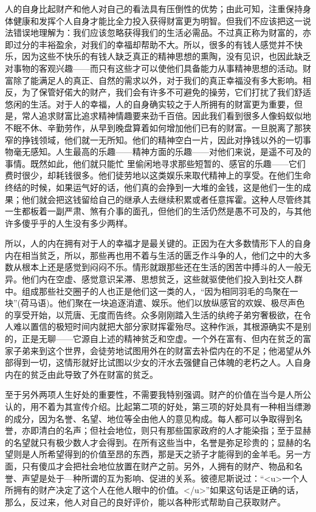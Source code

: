 \documentclass[12pt,oneside]{book}
\begin{document}
人的自身比起财产和他人对自己的看法具有压倒性的优势；由此可知，注重保持身体健康和发挥个人自身才能比全力投入获得财富更为明智。但我们不应该把这一说法错误地理解为：我们应该忽略获得我们的生活必需品。不过真正称为财富的，亦即过分的丰裕盈余，对我们的幸福却帮助不大。所以，很多的有钱人感觉并不快乐，因为这些不快乐的有钱人缺乏真正的精神思想的熏陶，没有见识，也因此缺乏对事物的客观兴趣——而只有这些才可以使他们具备能力从事精神思想的活动。财富除了能满足人的真正、自然的需求以外，对于我们的真正幸福没有多大影响。相反，为了保管好偌大的财产，我们会有许多不可避免的操劳，它们打扰了我们舒适悠闲的生活。对于人的幸福，人的自身确实较之于人所拥有的财富更为重要，但是，常人追求财富比追求精神情趣要来劲千百倍。因此我们看到很多人像蚂蚁似地不眠不休、辛勤劳作，从早到晚盘算着如何增加他们已有的财富。一旦脱离了那狭窄的挣钱领域，他们就一无所知。他们的精神空白一片，因此对挣钱以外的一切事物毫无感知。人生最高的乐趣——精神方面的乐趣——对他们来说，是遥不可及的事情。既然如此，他们就只能忙
里偷闲地寻求那些短暂的、感官的乐趣——它们费时很少，却耗钱很多。他们徒劳地以这类娱乐来取代精神上的享受。在他们生命终结的时候，如果运气好的话，他们真的会挣到一大堆的金钱，这是他们一生的成果；他们就会把这钱留给自己的继承人去继续积累或者任意挥霍。这种人尽管终其一生都板着一副严肃、煞有介事的面孔，但他们的生活仍然是愚不可及的，与其他许多傻乎乎的人生没有多少两样。 

所以，人的内在拥有对于人的幸福才是最关键的。正因为在大多数情形下人的自身内在相当贫乏，所以，那些再也用不着与生活的匮乏作斗争的人，他们之中的大多数从根本上还是感觉到闷闷不乐。情形就跟那些还在生活的困苦中搏斗的人一般无异。他们内在空虚、感觉意识呆滞、思想贫乏，这些就驱使他们投入到社交人群中。组成那些社交圈子的人也正是他们这一类的人，“因为相同羽毛的鸟聚在一块”(荷马语)。他们聚在一块追逐消遣、娱乐。他们以放纵感官的欢娱、极尽声色的享受开始，以荒唐、无度而告终。众多刚刚踏入生活的纨绔子弟穷奢极欲，在令人难以置信的极短时间内就把大部分家财挥霍殆尽。这种作派，其根源确实不是别的，正是无聊——它源自上述的精神贫乏和空虚。一个外在富有、但内在贫乏的富家子弟来到这个世界，会徒劳地试图用外在的财富去补偿内在的不足；他渴望从外部得到一切，这情形就好比试图以少女的汗水去强健自己体魄的老朽之人。人自身内在的贫乏由此导致了外在财富的贫乏。 

至于另外两项人生好处的重要性，不需要我特别强调。财产的价值在当今是人所公认的，用不着为其宣传介绍。比起第二项的好处，第三项的好处具有一种相当缥渺的成分，因为名誉、名望、地位等全由他人的意见构成。每人都可以争取得到名誉，亦即清白的名声；但社会地位，则只有那些国家政府的人才能染指；至于显赫的名望就只有极少数人才会得到。在所有这些当中，名誉是弥足珍贵的；显赫的名望则是人所希望得到的价值至昂的东西，那是天之骄子才能得到的金羊毛。另一方面，只有傻瓜才会把社会地位放置在财产之前。另外，人拥有的财产、物品和名誉、声望是处于—种所谓的互为影响、促进的关系。彼德尼斯说过：“<u>一个人所拥有的财产决定了这个人在他人眼中的价值。</u>”如果这句话是正确的话，那么，反过来，他人对自己的良好评价，能以各种形式帮助自己获取财产。 
\end{document}

